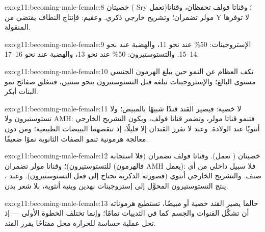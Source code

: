 \begin{solution}{exo:g11:becoming-male-female:8}
خصيتان ( Sry تعمل)؛ وقناتا فولف تحفظان، وقناتا مولر تضمران؛ وتشريح
خارجي ذكري. وعقيم: فإنتاج النطاف يقتضي  من  Y لا توفرها
 المنقولة.
\end{solution}

\begin{solution}{exo:g11:becoming-male-female:9}
الإستروجينات: 50\% عند نحو 11، والهضبة عند نحو 14--15. والتستوستيرون:
50\% عند نحو 13، والهضبة عند نحو 16--17.
\end{solution}

\begin{solution}{exo:g11:becoming-male-female:10}
تكف العظام عن النمو حين يبلغ الهرمون الجنسي مستوى البالغ؛ والإستروجينات
تبلغه قبل التستوستيرون بنحو سنتين، فتنغلق صفائح نمو البنات أبكر.
\end{solution}

\begin{solution}{exo:g11:becoming-male-female:11}
لا خصية: فيصير القند قندًا شبيهًا بالمبيض؛ ولا تستوستيرون ولا AMH:
فتنمو قناتا مولر، وتضمر قناتا فولف، ويكون التشريح الخارجي أنثويًا عند
الولادة. وعند  لا تفرز القندان إلا قليلًا، إذ تنقصهما البييضات
الطبيعية؛ ومن دون معالجة هرمونية تنمو الصفات الثانوية نموًا ضعيفًا.
\end{solution}

\begin{solution}{exo:g11:becoming-male-female:12}
خصيتان ( تعمل). وقناتا فولف تضمران (فلا استجابة للتستوستيرون)؛
وقناتا مولر تضمران (فالهرمون AMH يعمل): فلا سبيل داخلي من أي صنف. والتشريح
الخارجي أنثوي (فصورته الذكرية تحتاج إلى فعل التستوستيرون). وعند
، ينتج التستوستيرون المحوَّل إلى إستروجينات نهدين وبنية أنثوية،
بلا شعر بدن.
\end{solution}

\begin{solution}{exo:g11:becoming-male-female:13}
حالما يصير القند خصية أو مبيضًا، تستطيع هرموناته أن تشكّل القنوات
والجسم كما في الثدييات تمامًا؛ وإنما تختلف الخطوة الأولى --- إذ تحل
عملية حساسة للحرارة محل  مفتاحًا يقرر القند.
\end{solution}

